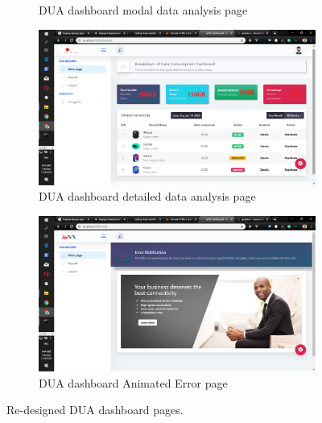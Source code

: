 \begin{itemize}
\begin{figure}[!htbp]
\begin{subfigure}[b]{0.45\textwidth}
		\caption{DUA dashboard modal data analysis page}
	\end{subfigure}
	\hfill
	\begin{subfigure}[b]{0.45\textwidth}
		\centering
		\includegraphics[width=\linewidth]{./duadatadetails}
		\caption{DUA dashboard detailed data analysis page}
	\end{subfigure}
	\medskip
	\begin{subfigure}[b]{0.5\textwidth}
		\centering
		\includegraphics[width=\linewidth]{./duaerror}
		\caption{DUA dashboard Animated Error page}
	\end{subfigure}
		\caption{Re-designed DUA dashboard pages.}
	\end{figure}
\end{itemize}

